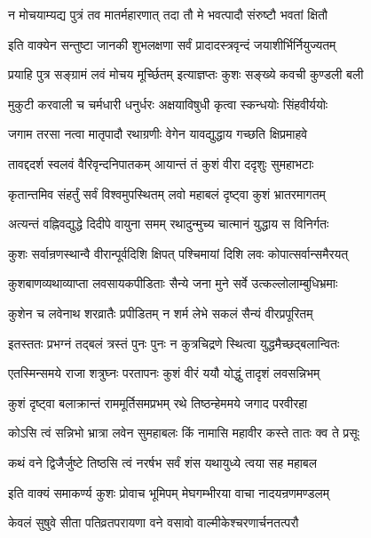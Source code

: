 \twolineshloka
{न मोचयाम्यद्य पुत्रं तव मातर्महारणात्}
{तदा तौ मे भवत्पादौ संरुष्टौ भवतां क्षितौ}%


\twolineshloka
{इति वाक्येन सन्तुष्टा जानकी शुभलक्षणा}
{सर्वं प्रादादस्त्रवृन्दं जयाशीर्भिर्नियुज्यतम्}%

\twolineshloka
{प्रयाहि पुत्र सङ्ग्रामं लवं मोचय मूर्च्छितम्}
{इत्याज्ञप्तः कुशः सङ्ख्ये कवची कुण्डली बली}%

\twolineshloka
{मुकुटी करवाली च चर्मधारी धनुर्धरः}
{अक्षयाविषुधी कृत्वा स्कन्धयोः सिंहवीर्ययोः}%

\twolineshloka
{जगाम तरसा नत्वा मातृपादौ रथाग्रणीः}
{वेगेन यावद्युद्धाय गच्छति क्षिप्रमाहवे}%

\twolineshloka
{तावद्ददर्श स्वलवं वैरिवृन्दनिपातकम्}
{आयान्तं तं कुशं वीरा ददृशुः सुमहाभटाः}%

\twolineshloka
{कृतान्तमिव संहर्तुं सर्वं विश्वमुपस्थितम्}
{लवो महाबलं दृष्ट्वा कुशं भ्रातरमागतम्}%

\twolineshloka
{अत्यन्तं वह्निवद्युद्धे दिदीपे वायुना समम्}
{रथादुन्मुच्य चात्मानं युद्धाय स विनिर्गतः}%

\twolineshloka
{कुशः सर्वान्रणस्थान्वै वीरान्पूर्वदिशि क्षिपत्}
{पश्चिमायां दिशि लवः कोपात्सर्वान्समैरयत्}%

\twolineshloka
{कुशबाणव्यथाव्याप्ता लवसायकपीडिताः}
{सैन्ये जना मुने सर्वे उत्कल्लोलाम्बुधिभ्रमाः}%

\twolineshloka
{कुशेन च लवेनाथ शरव्रातैः प्रपीडितम्}
{न शर्म लेभे सकलं सैन्यं वीरप्रपूरितम्}%

\twolineshloka
{इतस्ततः प्रभग्नं तद्बलं त्रस्तं पुनः पुनः}
{न कुत्रचिद्रणे स्थित्वा युद्धमैच्छद्बलान्वितः}%

\twolineshloka
{एतस्मिन्समये राजा शत्रुघ्नः परतापनः}
{कुशं वीरं ययौ योद्धुं तादृशं लवसन्निभम्}%

\twolineshloka
{कुशं दृष्ट्वा बलाक्रान्तं राममूर्तिसमप्रभम्}
{रथे तिष्ठन्हेममये जगाद परवीरहा}%


\twolineshloka
{कोऽसि त्वं सन्निभो भ्रात्रा लवेन सुमहाबलः}
{किं नामासि महावीर कस्ते तातः क्व ते प्रसूः}%

\twolineshloka
{कथं वने द्विजैर्जुष्टे तिष्ठसि त्वं नरर्षभ}
{सर्वं शंस यथायुध्ये त्वया सह महाबल}%

\twolineshloka
{इति वाक्यं समाकर्ण्य कुशः प्रोवाच भूमिपम्}
{मेघगम्भीरया वाचा नादयन्रणमण्डलम्}%

\twolineshloka
{केवलं सुषुवे सीता पतिव्रतपरायणा}
{वने वसावो वाल्मीकेश्चरणार्चनतत्परौ}%


